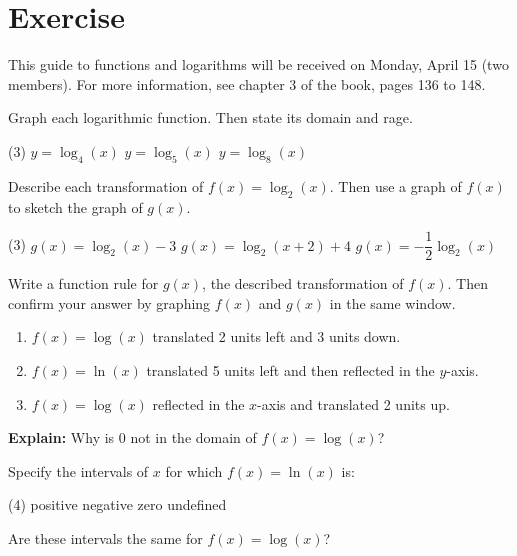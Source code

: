 \section{Exercise}

This guide to functions and logarithms will be received on Monday, April 15 (two members).
For more information, see chapter 3 of the book, pages 136 to 148.

\begin{exer}
    Graph each logarithmic function.
    Then state its domain and rage.

    \begin{tasks}(3)
        \task $y = \log_4 (x)$
        \task $y = \log_5 (x)$
        \task $y = \log_8 (x)$
    \end{tasks}
\end{exer}

\begin{exer}
    Describe each transformation of $f(x) = \log_2 (x)$.
    Then use a graph of $f(x)$ to sketch the graph of $g(x)$.
    \begin{tasks}(3)
        \task $g(x) = \log_2 (x) - 3$
        \task $g(x) = \log_2 (x + 2) + 4$
        \task $g(x) = - \dfrac{1}{2} \log_2 (x)$
    \end{tasks}
\end{exer}

\begin{exer}
    Write a function rule for $g(x)$, the described transformation of $f(x)$.
    Then confirm your answer by graphing $f(x)$ and $g(x)$ in the same window.
    \begin{enumerate}
        \item $f(x) = \log (x)$ translated 2 units left and 3 units down.
        \item $f(x) = \ln (x)$ translated 5 units left and then reflected in the $y$-axis.
        \item $f(x) = \log (x)$ reflected in the $x$-axis and translated 2 units up.
    \end{enumerate}
\end{exer}

\begin{exer}
    \textbf{Explain:} Why is 0 not in the domain of $f(x) = \log (x)$?
\end{exer}

\begin{exer}
    Specify the intervals of $x$ for which $f(x) = \ln (x)$ is:
    \begin{tasks}(4)
        \task positive
        \task negative
        \task zero
        \task undefined
    \end{tasks}
    Are these intervals the same for $f(x) = \log (x)$?
\end{exer}

